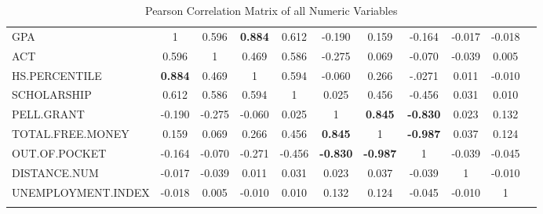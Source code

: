 \documentclass[12pt,english]{report}
\begin{document}
\begin{table}
{\begin{tabular}{@{\extracolsep{4pt}} lcccccccccc}
GPA                & 1              & 0.596  & \textbf{0.884}
& 0.612                                                   & -0.190
& 0.159                                                       & -0.164
& -0.017                                                  & -0.018
\\
ACT                & 0.596          & 1      & 0.469
& 0.586                                                   & -0.275
& 0.069                                                       & -0.070
& -0.039                                                  & 0.005
\\
HS.PERCENTILE      & \textbf{0.884} & 0.469  & 1
& 0.594                                                   & -0.060
& 0.266                                                       & -.0271
& 0.011                                                   & -0.010
\\
SCHOLARSHIP        & 0.612          & 0.586  & 0.594
& 1                                                       & 0.025
& 0.456                                                       & -0.456
& 0.031                                                   & 0.010
\\
PELL.GRANT         & -0.190         & -0.275 & -0.060
& 0.025                                                   & 1
& \textbf{0.845}                                              & \textbf{-0.830}
& 0.023                                                   & 0.132
\\
TOTAL.FREE.MONEY   & 0.159          & 0.069  & 0.266
& 0.456                                                   & \textbf{0.845}
& 1                                                           & \textbf{-0.987}
& 0.037                                                   & 0.124
\\
OUT.OF.POCKET      & -0.164         & -0.070 & -0.271
& -0.456                                                  & \textbf{-0.830}
& \textbf{-0.987}                                             & 1
& -0.039                                                  & -0.045
\\
DISTANCE.NUM       & -0.017         & -0.039 & 0.011
& 0.031                                                   & 0.023
& 0.037                                                       & -0.039
& 1                                                       & -0.010
\\
UNEMPLOYMENT.INDEX & -0.018         & 0.005  & -0.010
& 0.010                                                   & 0.132
& 0.124                                                       & -0.045
& -0.010                                                  & 1 \\
\hline \\[-1.8ex]                                                            
\end{tabular}}
\caption{Pearson Correlation Matrix of all Numeric Variables} 
  \label{correlation_matrix} 
\end{table}
\end{document}
